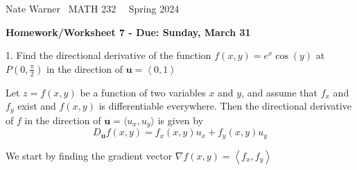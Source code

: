\documentclass{report}
\title{\Huge{}}
\author{\huge{Nathan Warner}}
\date{\huge{}}
\begin{document}
    \pagebreak \bigbreak \noindent
    Nate Warner \ \quad \quad \quad \quad \quad \quad \quad \quad \quad \quad \quad \quad  MATH 232 \quad  \quad \quad \quad \quad \quad \quad \quad \quad \ \ \quad \quad Spring 2024
    \begin{center}
        \textbf{Homework/Worksheet 7 - Due: Sunday, March 31}
    \end{center}
    \bigbreak \noindent 
    \begin{mdframed}
        1. Find the directional derivative of the function $f(x,y) = e^{x}\cos{\left(y\right)}$ at $P\left(0,\frac{\pi}{2}\right)$ in the direction of $\mathbf{u} = \left\langle 0,1 \right\rangle $
    \end{mdframed}
    \bigbreak \noindent 
    \begin{remark}
                Let $z=f(x,y)$ be a function of two variables $x$ and $y$, and assume that $f_x$ and $f_y$ exist and $f(x, y)$ is differentiable everywhere. Then the directional derivative of $f$ in the direction of $\mathbf{u}=\langle u_{x},u_{y}\rangle$ is given by
        \[
            D_{\mathbf{u}}f(x,y) = f_x(x,y)u_{x} + f_y(x,y)u_{y}
        \]
    \end{remark}
    \bigbreak \noindent 
    We start by finding the gradient vector $\nabla f(x,y) = \left\langle f_{x}, f_{y} \right\rangle$
\end{document}
